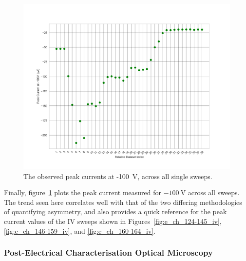 \begin{refsection}
\begin{figure}[H]
    \centering
    \includegraphics[width=\linewidth]{Chapter7/Figs/Raster/all_peak_current.png}
    \caption{The observed peak currents at -100~\si{\volt}, across all single sweeps.}
    \label{fig:e_ch_all_current}
\end{figure}

Finally, figure~\ref{fig:e_ch_all_current} plots the peak current measured for \(-100~\si{\volt}\) across all sweeps. The trend seen here correlates well with that of the two differing methodologies of quantifying asymmetry, and also provides a quick reference for the peak current values of the IV sweeps shown in Figures~\ref{fig:e_ch_124-145_iv}, \ref{fig:e_ch_146-159_iv}, and \ref{fig:e_ch_160-164_iv}.

\subsubsection{Post-Electrical Characterisation Optical Microscopy}


\end{refsection}
